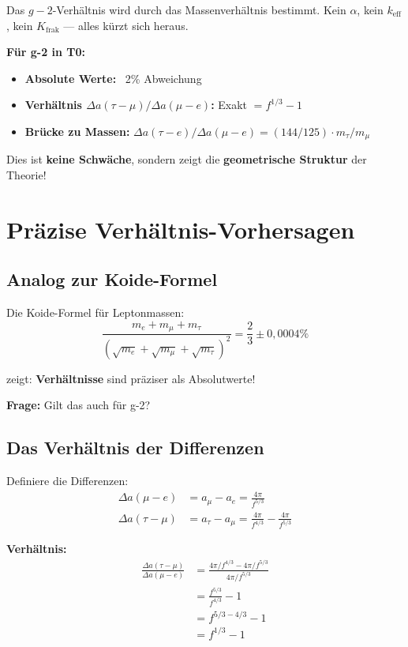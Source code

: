 	Das $g-2$-Verhältnis wird durch das Massenverhältnis bestimmt. Kein $\alpha$, kein $k_\text{eff}$, kein $K_\text{frak}$ — alles kürzt sich heraus.

	\textbf{Für g-2 in T0:}
	\begin{itemize}
		\item \textbf{Absolute Werte:} ~2\% Abweichung
		\item \textbf{Verhältnis $\Delta a(\tau-\mu)/\Delta a(\mu-e)$:} Exakt $= f^{1/3} - 1$
		\item \textbf{Brücke zu Massen:} $\Delta a(\tau{-}e)/\Delta a(\mu{-}e) = (144/125) \cdot m_\tau/m_\mu$
	\end{itemize}
	
	Dies ist \textbf{keine Schwäche}, sondern zeigt die \textbf{geometrische Struktur} der Theorie!	
	\section{Präzise Verhältnis-Vorhersagen}
	
	\subsection{Analog zur Koide-Formel}
	
	Die Koide-Formel für Leptonmassen:
	\begin{equation}
		\frac{m_e + m_\mu + m_\tau}{(\sqrt{m_e} + \sqrt{m_\mu} + \sqrt{m_\tau})^2} = \frac{2}{3} \pm 0{,}0004\%
	\end{equation}
	
	zeigt: \textbf{Verhältnisse} sind präziser als Absolutwerte!
	
	\textbf{Frage:} Gilt das auch für g-2?
	
	\subsection{Das Verhältnis der Differenzen}
	
	Definiere die Differenzen:
	\begin{align}
		\Delta a(\mu - e) &= a_\mu - a_e = \frac{4\pi}{f^{5/3}} \\
		\Delta a(\tau - \mu) &= a_\tau - a_\mu = \frac{4\pi}{f^{4/3}} - \frac{4\pi}{f^{5/3}}
	\end{align}
	
	\textbf{Verhältnis:}
	\begin{align}
		\frac{\Delta a(\tau - \mu)}{\Delta a(\mu - e)} &= \frac{4\pi/f^{4/3} - 4\pi/f^{5/3}}{4\pi/f^{5/3}} \\
		&= \frac{f^{5/3}}{f^{4/3}} - 1 \\
		&= f^{5/3 - 4/3} - 1 \\
		&= f^{1/3} - 1
		\label{eq:ratio}
	\end{align}
	
